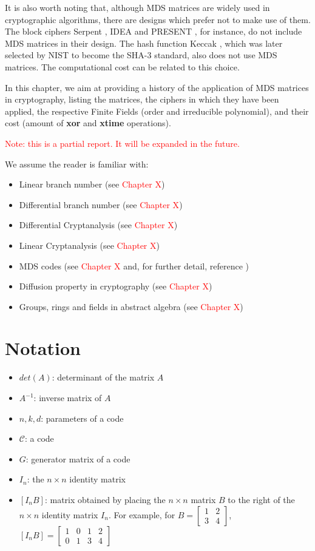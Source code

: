 \documentclass{report}
\begin{document}
It is also worth noting that, although MDS matrices are widely used in cryptographic algorithms, there are designs which prefer not to make use of them. The block ciphers Serpent \cite{Serpent1998}, IDEA \cite{IDEA2000} and PRESENT \cite{PRESENT2007}, for instance, do not include MDS matrices in their design. The hash function Keccak \cite{Keccak2013}, which was later selected by NIST to become the SHA-3 standard, also does not use MDS matrices. The computational cost can be related to this choice.

In this chapter, we aim at providing a history of the application of MDS matrices in cryptography, listing the matrices, the ciphers in which they have been applied, the respective Finite Fields (order and irreducible polynomial), and their cost (amount of \textbf{xor} and \textbf{xtime} operations).

\textcolor{red}{Note: this is a partial report. It will be expanded in the future.}

We assume the reader is familiar with:
\begin{itemize}
    \item Linear branch number (see \textcolor{red}{Chapter X})
    \item Differential branch number (see \textcolor{red}{Chapter X})
    \item Differential Cryptanalysis (see \textcolor{red}{Chapter X})
    \item Linear Cryptanalysis (see \textcolor{red}{Chapter X})
    \item MDS codes (see \textcolor{red}{Chapter X} and, for further detail, reference \cite{SloaneBook})
    \item Diffusion property in cryptography (see \textcolor{red}{Chapter X})
    \item Groups, rings and fields in abstract algebra (see \textcolor{red}{Chapter X})
\end{itemize}

\section{Notation}
\begin{itemize}
    \item $det(A)$: determinant of the matrix $A$
    \item $A^{-1}$: inverse matrix of $A$
    \item $n, k, d$: parameters of a code
    \item $\mathcal{C}$: a code
    \item $G$: generator matrix of a code
    \item $I_n$: the $n \times n$ identity matrix
    \item $[I_nB]$: matrix obtained by placing the $n \times n$ matrix $B$ to the right of the $n \times n$ identity matrix $I_n$. For example, for $B = \begin{bmatrix}1 & 2 \\ 3 & 4\end{bmatrix}$, $[I_nB] = \begin{bmatrix} 1 & 0 & 1 & 2 \\ 0 & 1 & 3 & 4\end{bmatrix}$
\end{itemize}
\end{document}

